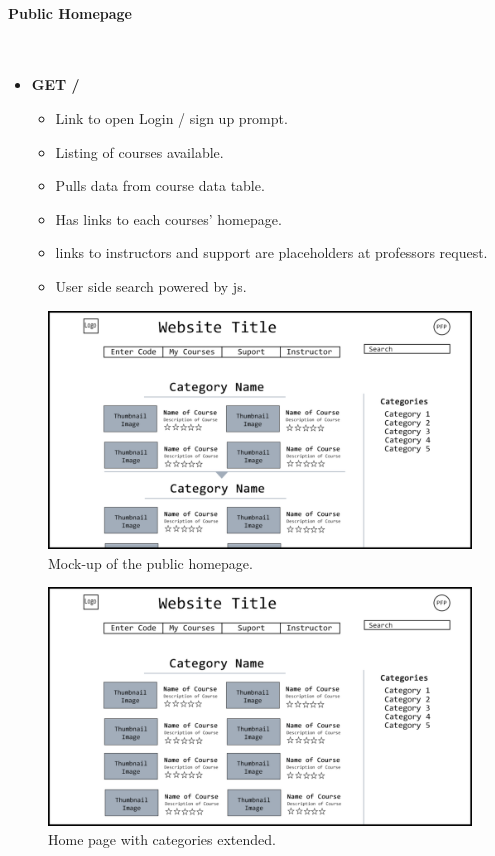 \documentclass{article}
\begin{document}
\newpage

\paragraph{Public Homepage}\\ 
\begin{itemize}
    \item \textbf{GET /}
    \begin{itemize}
        \item Link to open Login / sign up prompt.
        \item Listing of courses available.
        \item Pulls data from course data table.
        \item Has links to each courses' homepage.
        \item links to instructors and support are placeholders at professors request.
        \item User side search powered by js.
    \end{itemize}
\end{itemize}
\begin{figure}[h!]
    \caption{Mock-up of the public homepage.}
    \includegraphics[width=\textwidth]{home_page}
\end{figure}
\begin{figure}[h!]
    \caption{Home page with categories extended.}
    \includegraphics[width=\textwidth]{hompage_expanded}
\end{figure}
\end{document}
